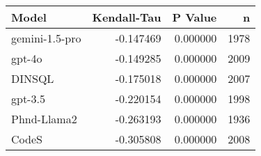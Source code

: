 \begin{tabular}{lrrr}
\toprule
Model & Kendall-Tau & P Value & n \\
\midrule
gemini-1.5-pro & -0.147469 & 0.000000 & 1978 \\
gpt-4o & -0.149285 & 0.000000 & 2009 \\
DINSQL & -0.175018 & 0.000000 & 2007 \\
gpt-3.5 & -0.220154 & 0.000000 & 1998 \\
Phnd-Llama2 & -0.263193 & 0.000000 & 1936 \\
CodeS & -0.305808 & 0.000000 & 2008 \\
\bottomrule
\end{tabular}
